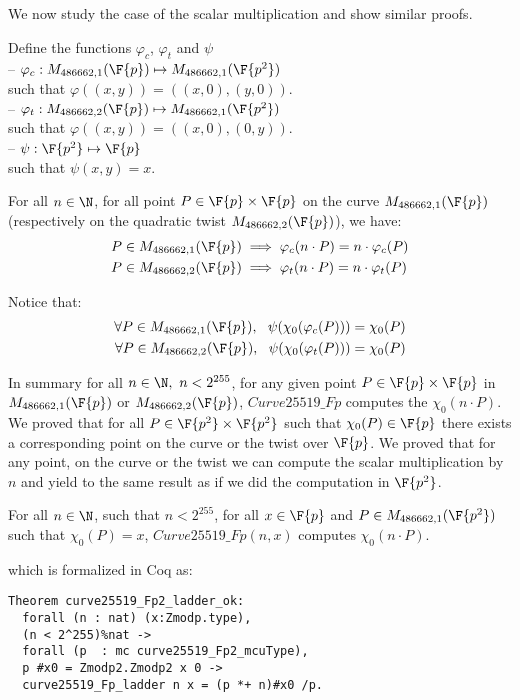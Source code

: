 We now study the case of the scalar multiplication and show similar proofs.
\begin{dfn}
Define the functions $\varphi_c$, $\varphi_t$ and $\psi$\\
-- $\varphi_c: M_{486662,1}(\F{p}) \mapsto M_{486662,1}(\F{p^2})$\\
  such that $\varphi((x,y)) = ((x,0), (y,0))$.\\
-- $\varphi_t: M_{486662,2}(\F{p}) \mapsto M_{486662,1}(\F{p^2})$\\
  such that $\varphi((x,y)) = ((x,0), (0,y))$.\\
-- $\psi: \F{p^2} \mapsto \F{p}$\\
  such that $\psi(x,y) = x$.
\end{dfn}

\begin{lemma}
  \label{lemma:proj}
  For all $n \in \N$, for all point $P\in\F{p}\times\F{p}$ on the curve
  $M_{486662,1}(\F{p})$ (respectively on the quadratic twist $M_{486662,2}(\F{p})$), we have:
  \begin{align*}
  P \in M_{486662,1}(\F{p}) &\implies \varphi_c(n \cdot P) = n \cdot \varphi_c(P)\\
  P \in M_{486662,2}(\F{p}) &\implies \varphi_t(n \cdot P) = n \cdot \varphi_t(P)
  \end{align*}
\end{lemma}
Notice that:
\begin{align*}
\forall P \in M_{486662,1}(\F{p}),\ \ \psi(\chi_0(\varphi_c(P))) = \chi_0(P)\\
\forall P \in M_{486662,2}(\F{p}),\ \ \psi(\chi_0(\varphi_t(P))) = \chi_0(P)
\end{align*}

In summary for all $n \in \N,\ n < 2^{255}$, for any given point $P\in\F{p}\times\F{p}$
in $M_{486662,1}(\F{p})$ or $M_{486662,2}(\F{p})$, $Curve25519\_Fp$
computes the $\chi_0(n \cdot P)$.
We proved that for all $P \in \F{p^2}\times\F{p^2}$ such that $\chi_0(P) \in \F{p}$
there exists a corresponding point on the curve or the twist over $\F{p}$.
We proved that for any point, on the curve or the twist we can compute the
scalar multiplication by $n$ and yield to the same result as if we did the
computation in $\F{p^2}$.
\begin{theorem}
  \label{thm:general-scalarmult}
  For all $n \in \N$, such that $n < 2^{255}$,
  for all $x \in \F{p}$ and $P \in M_{486662,1}(\F{p^2})$ such that $\chi_0(P) = x$,
  $Curve25519\_Fp(n,x)$ computes $\chi_0(n \cdot P)$.
\end{theorem}
which is formalized in Coq as:
\begin{lstlisting}[language=Coq,belowskip=-0.1 \baselineskip]
Theorem curve25519_Fp2_ladder_ok:
  forall (n : nat) (x:Zmodp.type),
  (n < 2^255)%nat ->
  forall (p  : mc curve25519_Fp2_mcuType),
  p #x0 = Zmodp2.Zmodp2 x 0 ->
  curve25519_Fp_ladder n x = (p *+ n)#x0 /p.
\end{lstlisting}

